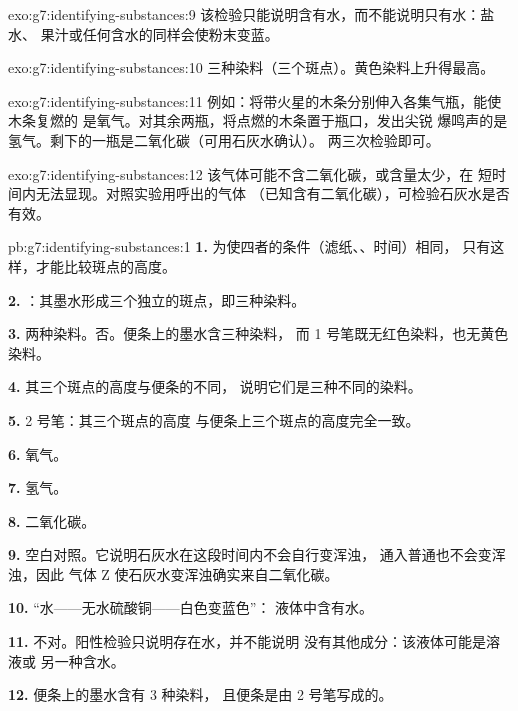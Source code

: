 \begin{solution}{exo:g7:identifying-substances:9}
该检验只能说明含有水，而不能说明只有水：盐水、
果汁或任何含水的同样会使粉末变蓝。
\end{solution}

\begin{solution}{exo:g7:identifying-substances:10}
三种染料（三个斑点）。黄色染料上升得最高。
\end{solution}

\begin{solution}{exo:g7:identifying-substances:11}
例如：将带火星的木条分别伸入各集气瓶，能使木条复燃的
是氧气。对其余两瓶，将点燃的木条置于瓶口，发出尖锐
爆鸣声的是氢气。剩下的一瓶是二氧化碳（可用石灰水确认）。
两三次检验即可。
\end{solution}

\begin{solution}{exo:g7:identifying-substances:12}
该气体可能不含二氧化碳，或含量太少，在
短时间内无法显现。对照实验用呼出的气体
（已知含有二氧化碳），可检验石灰水是否有效。
\end{solution}

\begin{solution}{pb:g7:identifying-substances:1}
\textbf{1.} 为使四者的条件（滤纸、、时间）相同，
只有这样，才能比较斑点的高度。

\textbf{2.} ：其墨水形成三个独立的斑点，即三种染料。

\textbf{3.} 两种染料。否。便条上的墨水含三种染料，
而 1 号笔既无红色染料，也无黄色染料。

\textbf{4.} 其三个斑点的高度与便条的不同，
说明它们是三种不同的染料。

\textbf{5.} 2 号笔：其三个斑点的高度
与便条上三个斑点的高度完全一致。

\textbf{6.} 氧气。

\textbf{7.} 氢气。

\textbf{8.} 二氧化碳。

\textbf{9.} 空白对照。它说明石灰水在这段时间内不会自行变浑浊，
通入普通也不会变浑浊，因此
气体 Z 使石灰水变浑浊确实来自二氧化碳。

\textbf{10.} “水——无水硫酸铜——白色变蓝色”：
液体中含有水。

\textbf{11.} 不对。阳性检验只说明存在水，并不能说明
没有其他成分：该液体可能是溶液或
另一种含水。

\textbf{12.} 便条上的墨水含有 3 种染料，
且便条是由 2 号笔写成的。
\end{solution}
